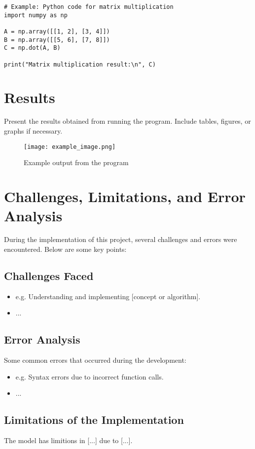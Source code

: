 \documentclass[a4paper,12pt]{article}
\begin{document}
\begin{lstlisting}
# Example: Python code for matrix multiplication
import numpy as np

A = np.array([[1, 2], [3, 4]])
B = np.array([[5, 6], [7, 8]])
C = np.dot(A, B)

print("Matrix multiplication result:\n", C)
\end{lstlisting}

\section{Results}
Present the results obtained from running the program. Include tables, figures, or graphs if necessary.

\begin{figure}[h]
    \centering
    \texttt{[image: example\_image.png]}
    \caption{Example output from the program}
    \label{fig:example}
\end{figure}

\section{Challenges, Limitations, and Error Analysis}
During the implementation of this project, several challenges and errors were encountered. Below are some key points:

\subsection{Challenges Faced}
\begin{itemize}
    \item e.g. Understanding and implementing [concept or algorithm].
    \item ...
\end{itemize}

\subsection{Error Analysis}
Some common errors that occurred during the development:
\begin{itemize}
    \item e.g. Syntax errors due to incorrect function calls.
    \item ...
\end{itemize}

\subsection{Limitations of the Implementation}
The model has limitions in [...]  due to [...].
\end{document}
